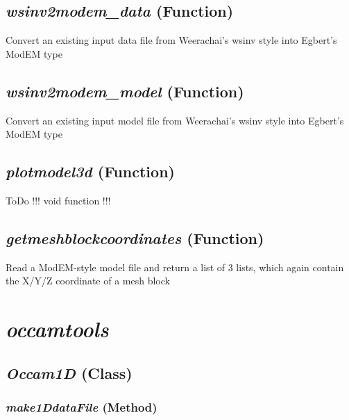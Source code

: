 \subsection{\textit{wsinv2modem\_data} (Function)}
\label{ssec:.modeling.modemtools.wsinv2modem_data}

    Convert an existing input data file from Weerachai's wsinv style into Egbert's ModEM type


\subsection{\textit{wsinv2modem\_model} (Function)}
\label{ssec:.modeling.modemtools.wsinv2modem_model}

    Convert an existing input model file from Weerachai's wsinv style into Egbert's ModEM type


\subsection{\textit{plotmodel3d} (Function)}
\label{ssec:.modeling.modemtools.plotmodel3d}

ToDo !!! void function !!! 

\subsection{\textit{getmeshblockcoordinates} (Function)}
\label{ssec:.modeling.modemtools.getmeshblockcoordinates}

Read a ModEM-style model file and return a list of 3 lists, which again contain the X/Y/Z coordinate of a mesh block




\section{\textit{occamtools} }
\label{sec:modeling.occamtools}



\subsection{\textit{Occam1D} (Class)}
\label{ssec:.modeling.occamtools.Occam1D}



\subsubsection{\textit{make1DdataFile} (Method)}
\label{sssec:.modeling.occamtools.Occam1D.make1DdataFile}



